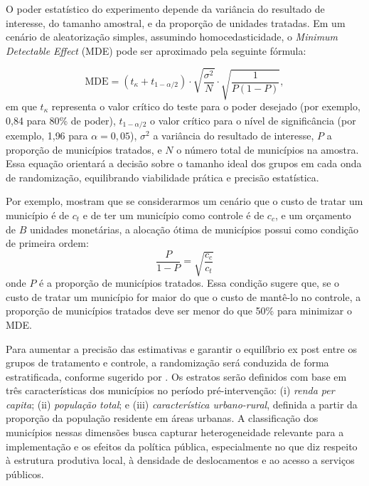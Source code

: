 O poder estatístico do experimento depende da variância do resultado de interesse, do tamanho amostral, e da proporção de unidades tratadas. Em um cenário de aleatorização simples, assumindo homocedasticidade, o \textit{Minimum Detectable Effect} (MDE) pode ser aproximado pela seguinte fórmula:

\begin{equation}
    \text{MDE} = (t_{\kappa} + t_{1 - \alpha/2}) \cdot \sqrt{\frac{\sigma^2}{N}} \cdot \sqrt{\frac{1}{P(1 - P)}},
\end{equation}
em que $t_{\kappa}$ representa o valor crítico do teste para o poder desejado (por exemplo, 0{,}84 para 80\% de poder), $t_{1 - \alpha/2}$ o valor crítico para o nível de significância (por exemplo, 1{,}96 para $\alpha = 0{,}05$), $\sigma^2$ a variância do resultado de interesse, $P$ a proporção de municípios tratados, e $N$ o número total de municípios na amostra. Essa equação orientará a decisão sobre o tamanho ideal dos grupos em cada onda de randomização, equilibrando viabilidade prática e precisão estatística. 

Por exemplo,  mostram que se considerarmos um cenário que o custo de tratar um município é de $c_t$ e de ter um município como controle é de $c_c$, e um orçamento de $B$ unidades monetárias, a alocação ótima de municípios possui como condição de primeira ordem:
\begin{equation}
    \frac{P}{1 - P} = \sqrt{\frac{c_c}{c_t}} 
\end{equation}
onde $P$ é a proporção de municípios tratados. Essa condição sugere que, se o custo de tratar um município for maior do que o custo de mantê-lo no controle, a proporção de municípios tratados deve ser menor do que 50\% para minimizar o MDE.

Para aumentar a precisão das estimativas e garantir o equilíbrio ex post entre os grupos de tratamento e controle, a randomização será conduzida de forma estratificada, conforme sugerido por . Os estratos serão definidos com base em três características dos municípios no período pré-intervenção: (i) \textit{renda per capita}; (ii) \textit{população total}; e (iii) \textit{característica urbano-rural}, definida a partir da proporção da população residente em áreas urbanas. A classificação dos municípios nessas dimensões busca capturar heterogeneidade relevante para a implementação e os efeitos da política pública, especialmente no que diz respeito à estrutura produtiva local, à densidade de deslocamentos e ao acesso a serviços públicos.

